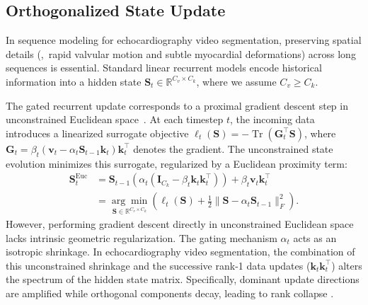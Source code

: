 \subsection{Orthogonalized State Update}

\noindent
In sequence modeling for echocardiography video segmentation, preserving spatial details (\eg,~rapid valvular motion and subtle myocardial deformations) across long sequences is essential.
Standard linear recurrent models \cite{katharopoulos_transformers_2020,ICML20_ttt,ICML21_fwp,ICLR25_gdn,ICLR26_ttt_LaCT} encode historical information into a hidden state $\mathbf{S}_t \in \mathbb{R}^{C_v \times C_k}$, where we assume $C_v \ge C_k$.

The gated recurrent update \cite{ICLR25_gdn,ICCV25_gdkvm,arxiv25_kimidelta} corresponds to a proximal gradient descent step in unconstrained Euclidean space~\cite{FTO16_Hazan}.
At each timestep $t$, the incoming data introduces a linearized surrogate objective $\ell_t(\mathbf{S}) = -\operatorname{Tr}(\mathbf{G}_t^\top \mathbf{S})$, where $\mathbf{G}_t = \beta_t (\mathbf{v}_t - \alpha_t \mathbf{S}_{t-1} \mathbf{k}_t) \mathbf{k}_t^\top$ denotes the gradient.
The unconstrained state evolution minimizes this surrogate, regularized by a Euclidean proximity term:
\begin{equation}
  \begin{aligned}
    \mathbf{S}_t^{\text{Euc}} &= \mathbf{S}_{t-1}\left(\alpha_t (\mathbf{I}_{C_k} - \beta_t \mathbf{k}_t \mathbf{k}_t^\top)\right) + \beta_t \mathbf{v}_t \mathbf{k}_t^\top \\
    &= \underset{\mathbf{S} \in \mathbb{R}^{C_v \times C_k}}{\arg\min} \left( \ell_t(\mathbf{S}) + \frac{1}{2} \|\mathbf{S} - \alpha_t \mathbf{S}_{t-1}\|_F^2 \right).
  \end{aligned}
\end{equation}
However, performing gradient descent directly in unconstrained Euclidean space lacks intrinsic geometric regularization.
The gating mechanism $\alpha_t$ acts as an isotropic shrinkage.
In echocardiography video segmentation, the combination of this unconstrained shrinkage and the successive rank-1 data updates ($\mathbf{k}_t \mathbf{k}_t^\top$) alters the spectrum of the hidden state matrix.
Specifically, dominant update directions are amplified while orthogonal components decay, leading to rank collapse \cite{ICML16_urnn,NIPS16_fullurnn}.


